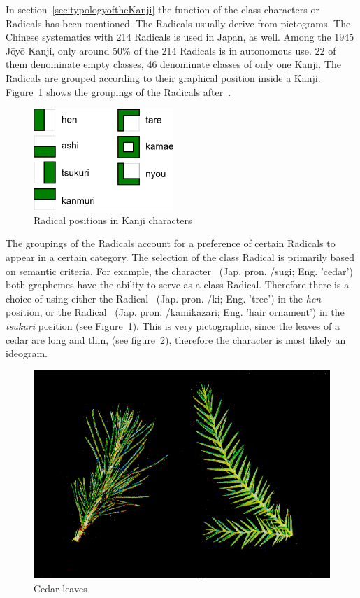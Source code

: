 In section~\ref{sec:typologyoftheKanji} the function of the class characters or
Radicals has been mentioned. The Radicals usually derive from pictograms. The
Chinese systematics with 214 Radicals is used in Japan, as well. Among the 
1945 Jōyō Kanji, only around 50\% of the 214 Radicals is in autonomous use.
22 of them denominate empty classes, 46 denominate classes of only one Kanji.
The Radicals are grouped according to their graphical position inside a Kanji.
Figure~\ref{fig:radicalPositions} shows the groupings of the Radicals 
after~.
\begin{figure}[htbp]
\begin{center}
\includegraphics{images/radicalStructure/radicalPositions.png}
\caption{Radical positions in Kanji characters}
\label{fig:radicalPositions}
\end{center}
\end{figure}
The groupings of the Radicals account for a preference of certain Radicals
to appear in a certain category. The selection of the class Radical is primarily
based on semantic criteria. For example, the character ~(Jap. pron. 
/sugi; Eng. 'cedar') both graphemes have the ability to serve as a 
class Radical. Therefore there is a choice of using either the Radical 
~(Jap. pron. /ki; Eng. 'tree') in the \emph{hen} position, 
or the Radical ~(Jap. pron. /kamikazari; 
Eng. 'hair ornament') in the \emph{tsukuri} position (see 
Figure~\ref{fig:radicalPositions}). This is very pictographic, since the leaves
of a cedar are long and thin, (see figure~\ref{fig:cedarleaves}), 
therefore the character is most likely an ideogram.
\begin{figure}[htbp]
\begin{center}
\includegraphics[scale=0.4]{images/radicalStructure/cedar.png}
\caption{Cedar leaves}
\label{fig:cedarleaves}
\end{center}
\end{figure}
